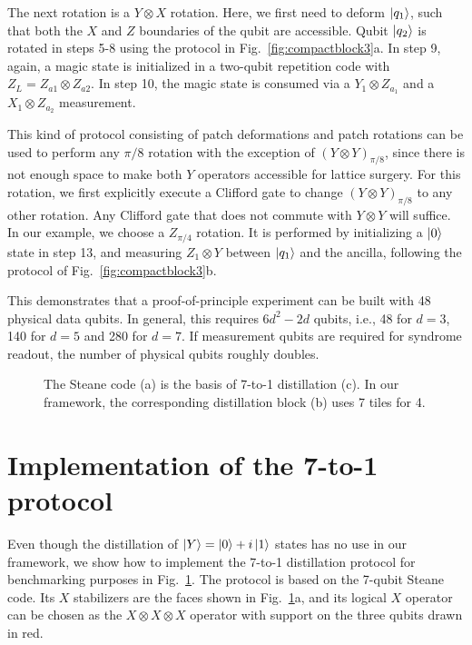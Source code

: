 \documentclass[prx,aps,letterpaper,twocolumn,allowfontchageintitle=true,accepted=2019-02-01]{quantumarticle}
\begin{document}
The next rotation is a $Y \otimes X$ rotation. Here, we first need to deform $\ket{q_1}$, such that both the $X$ and $Z$ boundaries of the qubit are accessible. Qubit $\ket{q_2}$ is rotated in steps 5-8 using the protocol in Fig.~\ref{fig:compactblock3}a. In step 9, again, a magic state is initialized in a two-qubit repetition code with $Z_L = Z_{a1} \otimes Z_{a2}$. In step 10, the magic state is consumed via a $Y_1 \otimes Z_{a_1}$ and a $X_1 \otimes Z_{a_2}$ measurement.

This kind of protocol consisting of patch deformations and patch rotations can be used to perform any $\pi/8$ rotation with the exception of $(Y\otimes Y)_{\pi/8}$, since there is not enough space to make both $Y$ operators accessible for lattice surgery. For this rotation, we first explicitly execute a Clifford gate to change $(Y\otimes Y)_{\pi/8}$ to any other rotation. Any Clifford gate that does not commute with $Y\otimes Y$ will suffice. In our example, we choose a $Z_{\pi/4}$ rotation. It is performed by initializing a $\ket{0}$ state in step 13, and measuring $Z_1 \otimes Y$ between $\ket{q_1}$ and the ancilla, following the protocol of Fig.~\ref{fig:compactblock3}b.



This demonstrates that a proof-of-principle experiment can be built with 48 physical data qubits. In general, this requires $6d^2-2d$ qubits, i.e., 48 for $d=3$, 140 for $d=5$ and 280 for $d=7$. If measurement qubits are required for syndrome readout, the number of physical qubits roughly doubles.

\begin{figure}[!t]
\centering
\def\svgwidth{0.9\linewidth}

\caption{The Steane code (a) is the basis of 7-to-1 distillation (c). In our framework, the corresponding distillation block (b) uses 7 tiles for 4\clock.}
\label{fig:7to1}
\end{figure}



\section{Implementation of the 7-to-1 protocol}
\label{app:7to1}

Even though the distillation of $\ket{Y} = \ket{0} + i \ket{1}$ states has no use in our framework, we show how to implement the 7-to-1 distillation protocol for benchmarking purposes in Fig.~\ref{fig:7to1}. The protocol is based on the 7-qubit Steane code. Its $X$ stabilizers are the faces shown in Fig.~\ref{fig:7to1}a, and its logical $X$ operator can be chosen as the $X\otimes X \otimes X$ operator with support on the three qubits drawn in red. 
\end{document}
